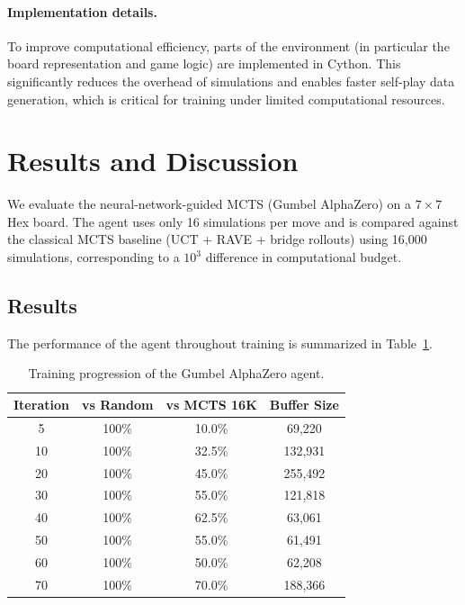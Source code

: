 \documentclass[11pt,a4paper]{article}
\begin{document}
\paragraph{Implementation details.}
To improve computational efficiency, parts of the environment (in particular the board representation and game logic) are implemented in Cython. This significantly reduces the overhead of simulations and enables faster self-play data generation, which is critical for training under limited computational resources.

\section{Results and Discussion}

We evaluate the neural-network-guided MCTS (Gumbel AlphaZero) on a $7 \times 7$ Hex board. The agent uses only 16 simulations per move and is compared against the classical MCTS baseline (UCT + RAVE + bridge rollouts) using 16,000 simulations, corresponding to a $10^3$ difference in computational budget.

\subsection{Results}

The performance of the agent throughout training is summarized in Table~\ref{tab:gumbel_results}.

\begin{table}[!h]
\centering
\begin{tabular}{|c|c|c|c|}
\hline
Iteration & vs Random & vs MCTS 16K & Buffer Size \\
\hline
5  & 100\% & 10.0\% & 69,220 \\
10 & 100\% & 32.5\% & 132,931 \\
20 & 100\% & 45.0\% & 255,492 \\
30 & 100\% & 55.0\% & 121,818 \\
40 & 100\% & 62.5\% & 63,061 \\
50 & 100\% & 55.0\% & 61,491 \\
60 & 100\% & 50.0\% & 62,208 \\
70 & 100\% & 70.0\% & 188,366 \\
\hline
\end{tabular}
\caption{Training progression of the Gumbel AlphaZero agent.}
\label{tab:gumbel_results}
\end{table}

\medskip
\end{document}
